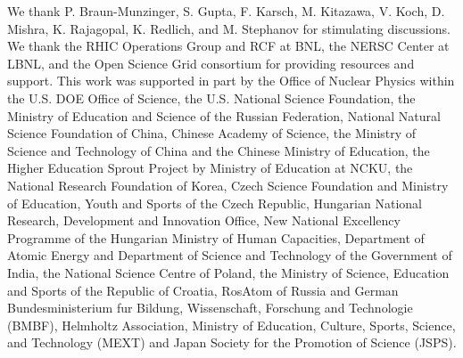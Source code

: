 \documentclass[10pt,aps,prc,twocolumn,floatfix]{revtex4-1}
\begin{document}
We thank P. Braun-Munzinger, S. Gupta, F. Karsch, M. Kitazawa, V. Koch,
D. Mishra, K. Rajagopal, K. Redlich, and M. Stephanov for stimulating discussions.
We thank the RHIC Operations Group and RCF at BNL, the NERSC Center at LBNL, and the Open Science Grid consortium for providing resources and support.  This work was supported in part by the Office of Nuclear Physics within the U.S. DOE Office of Science, the U.S. National Science Foundation, the Ministry of Education and Science of the Russian Federation, National Natural Science Foundation of China, Chinese Academy of Science, the Ministry of Science and Technology of China and the Chinese Ministry of Education, the Higher Education Sprout Project by Ministry of Education at NCKU, the National Research Foundation of Korea, Czech Science Foundation and Ministry of Education, Youth and Sports of the Czech Republic, Hungarian National Research, Development and Innovation Office, New National Excellency Programme of the Hungarian Ministry of Human Capacities, Department of Atomic Energy and Department of Science and Technology of the Government of India, the National Science Centre of Poland, the Ministry  of Science, Education and Sports of the Republic of Croatia, RosAtom of Russia and German Bundesministerium fur Bildung, Wissenschaft, Forschung and Technologie (BMBF), Helmholtz Association, Ministry of Education, Culture, Sports, Science, and Technology (MEXT) and Japan Society for the Promotion of Science (JSPS).
\end{document}
